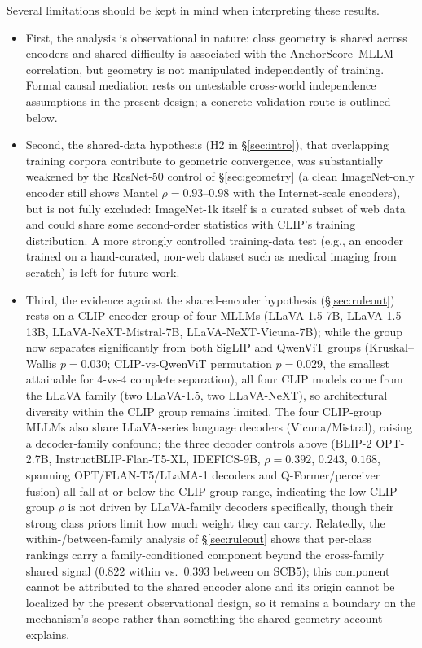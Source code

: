 \documentclass[a4paper,fleqn]{cas-sc}
\begin{document}
Several limitations should be kept in mind when interpreting these results.
\begin{itemize}
  \item First, the analysis is observational in nature: class geometry is shared across encoders and shared difficulty is associated with the AnchorScore--MLLM correlation, but geometry is not manipulated independently of training. Formal causal mediation rests on untestable cross-world independence assumptions in the present design; a concrete validation route is outlined below.
  \item Second, the shared-data hypothesis (H2 in \S\ref{sec:intro}), that overlapping training corpora contribute to geometric convergence, was substantially weakened by the ResNet-50 control of \S\ref{sec:geometry} (a clean ImageNet-only encoder still shows Mantel $\rho=0.93$--$0.98$ with the Internet-scale encoders), but is not fully excluded: ImageNet-1k itself is a curated subset of web data and could share some second-order statistics with CLIP's training distribution. A more strongly controlled training-data test (e.g., an encoder trained on a hand-curated, non-web dataset such as medical imaging from scratch) is left for future work.
  \item Third, the evidence against the shared-encoder hypothesis (\S\ref{sec:ruleout}) rests on a CLIP-encoder group of four MLLMs (LLaVA-1.5-7B, LLaVA-1.5-13B, LLaVA-NeXT-Mistral-7B, LLaVA-NeXT-Vicuna-7B); while the group now separates significantly from both SigLIP and QwenViT groups (Kruskal--Wallis $p=0.030$; CLIP-vs-QwenViT permutation $p=0.029$, the smallest attainable for $4$-vs-$4$ complete separation), all four CLIP models come from the LLaVA family (two LLaVA-1.5, two LLaVA-NeXT), so architectural diversity within the CLIP group remains limited. The four CLIP-group MLLMs also share LLaVA-series language decoders (Vicuna/Mistral), raising a decoder-family confound; the three decoder controls above (BLIP-2 OPT-2.7B, InstructBLIP-Flan-T5-XL, IDEFICS-9B, $\rho=0.392$, $0.243$, $0.168$, spanning OPT/FLAN-T5/LLaMA-1 decoders and Q-Former/perceiver fusion) all fall at or below the CLIP-group range, indicating the low CLIP-group $\rho$ is not driven by LLaVA-family decoders specifically, though their strong class priors limit how much weight they can carry. Relatedly, the within-/between-family analysis of \S\ref{sec:ruleout} shows that per-class rankings carry a family-conditioned component beyond the cross-family shared signal ($0.822$ within vs.\ $0.393$ between on SCB5); this component cannot be attributed to the shared encoder alone and its origin cannot be localized by the present observational design, so it remains a boundary on the mechanism's scope rather than something the shared-geometry account explains.

\end{itemize}
\end{document}
